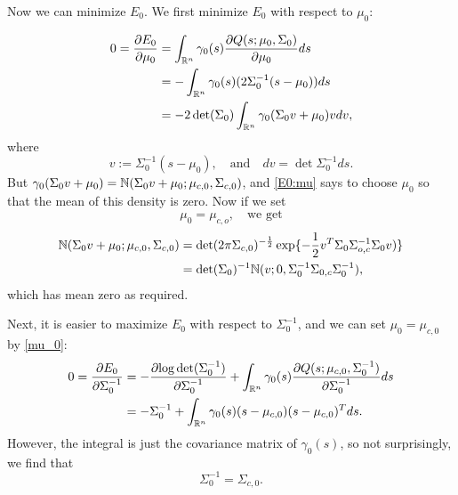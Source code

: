 \documentclass[12pt,leqno]{article}
\begin{document}
Now we can minimize $E_0$. We first minimize $E_0$ with respect to $\mu_0$: 

\begin{align}
0 = \frac{\partial{E_0}}{\partial{\mu_0}} &= \int_{{\mathbb R}^n}\gamma_0(s)\frac{\partial{Q(s;\mu_0,\Sigma_0)}}{\partial{\mu_0}}ds 
\notag\\
&= -\int_{{\mathbb R}^n}\gamma_0(s)(2\Sigma_0^{-1}(s-\mu_0))ds\notag\\
&= -2\det(\Sigma_0)\int_{{\mathbb R}^n}\gamma_0(\Sigma_0v+\mu_0)vdv,\label{E0:mu}
\end{align}
where
$$
v := \Sigma_0^{-1}(s-\mu_0), \quad\text{and}\quad dv = \det\Sigma_0^{-1}ds.
$$
But $\gamma_0(\Sigma_0v+\mu_0) = {\mathbb N}(\Sigma_0v+\mu_0;\mu_{c,0},\Sigma_{c,0})$, and
\eqref{E0:mu} says to choose $\mu_0$ so that the mean of this density is zero.
Now if we set 
\begin{equation}\label{mu_0}
\mu_0 = \mu_{c,o},\quad\text{we get}
\end{equation}
\begin{align*}
{\mathbb N}(\Sigma_0v+\mu_0;\mu_{c,0},\Sigma_{c,0}) &= \det(2\pi\Sigma_{c,0})^{-\frac{1}{2}}\exp\{-\frac{1}{2}v^T\Sigma_0\Sigma_{o,c}^{-1}\Sigma_0v)\}\\
&= \det(\Sigma_0)^{-1}{\mathbb N}(v;0,\Sigma_0^{-1}\Sigma_{0,c}\Sigma_0^{-1}),
\end{align*}
which has mean zero as required.

Next, it is easier to maximize $E_0$ with respect to $\Sigma_0^{-1}$, and we can set $\mu_0 = \mu_{c,0}$ by \eqref{mu_0}:
\begin{align*}
0 = \frac{\partial{E_0}}{\partial{\Sigma_0^{-1}}} &= -\frac{\partial{\log\det(\Sigma_0^{-1})}}{\partial\Sigma_0^{-1}} + \int_{{\mathbb R}^n}\gamma_0(s)\frac{\partial{Q(s;\mu_{c,0},\Sigma_0^{-1})}}{\partial{\Sigma_0^{-1}}}ds \\
&= -\Sigma_0^{-1} + \int_{{\mathbb R}^n}\gamma_0(s)(s-\mu_{c,0})(s-\mu_{c,0})^Tds.
\end{align*}
However, the integral is just the covariance matrix of $\gamma_0(s)$, so not surprisingly, we find that
$$
\Sigma_0^{-1} = \Sigma_{c,0}.
$$
\end{document}
